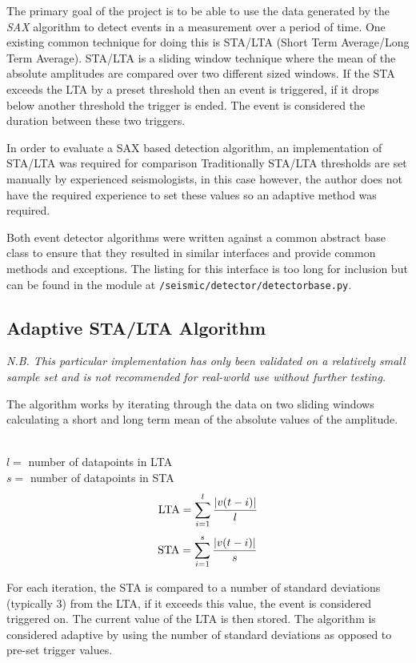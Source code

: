 \documentclass[../report.tex]{subfiles}
\begin{document}
 
	The primary goal of the project is to be able to use the data generated by the \textit{SAX} algorithm to detect events in a measurement over a period of time.  One existing common technique for doing this is STA/LTA (Short Term Average/Long Term Average).  STA/LTA is a sliding window technique where the mean of the absolute amplitudes are compared over two different sized windows.  If the STA exceeds the LTA by a preset threshold then an event is triggered, if it drops below another threshold the trigger is ended.  The event is considered the duration between these two triggers.
	
	In order to evaluate a SAX based detection algorithm, an implementation of STA/LTA was required for comparison  Traditionally STA/LTA thresholds are set manually by experienced seismologists, in this case however, the author does not have the required experience to set these values so an adaptive method was required.
	
	Both event detector algorithms were written against a common abstract base class to ensure that they resulted in similar interfaces and provide common methods and exceptions.  The listing for this interface is too long for inclusion but can be found in the module at \texttt{/seismic/detector/detectorbase.py}.
	
\subsection{Adaptive STA/LTA Algorithm} \label{sec:stalta-detect}

	\textit{N.B.  This particular implementation has only been validated on a relatively small sample set and is not recommended for real-world use without further testing.}

	The algorithm works by iterating through the data on two sliding windows calculating a short and long term mean of the absolute values of the amplitude.

	\noindent
	\\
	$l = $ number of datapoints in LTA \\
	$s = $ number of datapoints in STA \\

	$$ \text{LTA} = \sum_{i=1}^{l}\dfrac{\abs{v(t - i)}}{l} $$
	$$ \text{STA} = \sum_{i=1}^{s}\dfrac{\abs{v(t - i)}}{s} $$

	
	For each iteration, the STA is compared to a number of standard deviations (typically 3) from the LTA, if it exceeds this value, the event is considered triggered on.  The current value of the LTA is then stored.  The algorithm is considered adaptive by using the number of standard deviations as opposed to pre-set trigger values.
	
\end{document}
